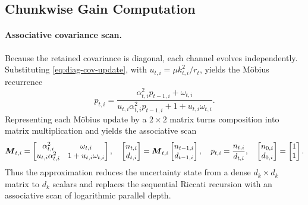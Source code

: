 \documentclass{article} %
\begin{document}
\subsection{Chunkwise Gain Computation}
\label{sec:chunkwise-gain}

\paragraph{Associative covariance scan.}
Because the retained covariance is diagonal, each channel evolves independently. Substituting
\eqref{eq:diag-cov-update}, with $u_{t,i}=\mu k_{t,i}^2/r_t$, yields the M\"obius recurrence
\begin{equation}
  p_{t,i}
  =\frac{\alpha_{t,i}^2p_{t-1,i}+\omega_{t,i}}
    {u_{t,i}\alpha_{t,i}^2p_{t-1,i}+1+u_{t,i}\omega_{t,i}}.
  \label{eq:diag-cov-mobius}
\end{equation}
Representing each M\"obius update by a $2\times2$ matrix turns composition into matrix
multiplication and yields the associative scan
\begin{equation}
  \begin{gathered}
    \boldsymbol{M}_{t,i}
    =\begin{bmatrix}
      \alpha_{t,i}^2 & \omega_{t,i}\\
      u_{t,i}\alpha_{t,i}^2 & 1+u_{t,i}\omega_{t,i}
    \end{bmatrix},
    \quad
    \begin{bmatrix}n_{t,i}\\d_{t,i}\end{bmatrix}
    =\boldsymbol{M}_{t,i}
      \begin{bmatrix}n_{t-1,i}\\d_{t-1,i}\end{bmatrix},
    \quad
    p_{t,i}=\frac{n_{t,i}}{d_{t,i}},
    \quad
    \begin{bmatrix}n_{0,i}\\d_{0,i}\end{bmatrix}
    =\begin{bmatrix}1\\1\end{bmatrix}.
  \end{gathered}
  \label{eq:diag-cov-scan}
\end{equation}
Thus the approximation reduces the uncertainty state from a dense $d_k\times d_k$ matrix to
$d_k$ scalars and replaces the sequential Riccati recursion with an associative scan of
logarithmic parallel depth.
\end{document}
